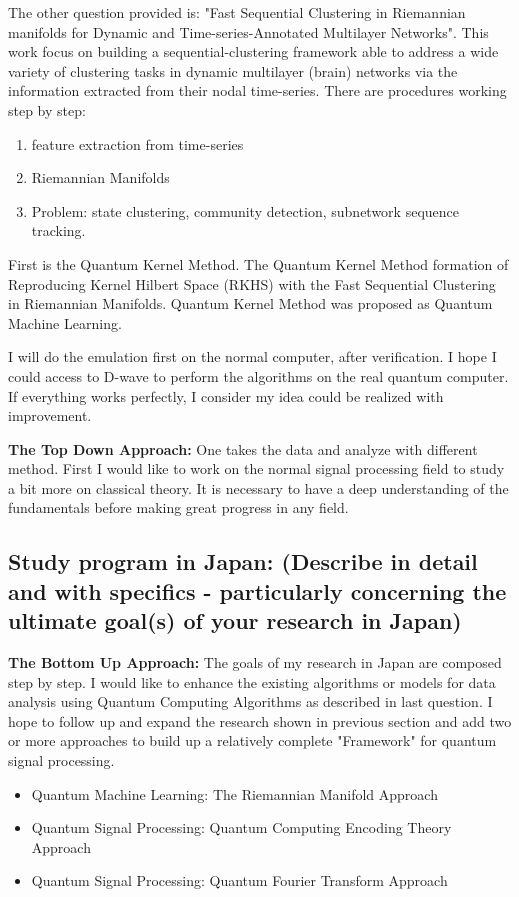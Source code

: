 \documentclass{article}
\begin{document}
The other question provided is: "Fast Sequential Clustering in Riemannian 
manifolds for Dynamic and Time-series-Annotated Multilayer Networks". This 
work focus on building a sequential-clustering framework able to address 
a wide variety of clustering tasks in dynamic multilayer (brain) networks 
via the information extracted from their nodal time-series. 
There are procedures working step by step: 
\begin{enumerate}
  \item feature extraction from time-series 
  \item Riemannian Manifolds 
  \item Problem: state clustering, community detection, 
  subnetwork sequence tracking.  
\end{enumerate}

First is the Quantum Kernel Method. 
The Quantum Kernel Method formation of 
Reproducing Kernel Hilbert Space (RKHS) with the 
Fast Sequential Clustering in Riemannian Manifolds. 
Quantum Kernel Method was proposed as Quantum Machine Learning.

I will do the emulation first on the normal computer, after verification.
I hope I could access to D-wave to perform the algorithms on the real quantum
computer.  If everything works perfectly, I consider my idea could be 
realized with improvement. 

\textbf{The Top Down Approach:}
One takes the data and analyze with 
different method. First I would like to work on the normal signal processing field 
to study a bit more on classical theory. It is necessary to have 
a deep understanding of the fundamentals before making great 
progress in any field. 

\subsection{Study program in Japan: 
(Describe in detail and with specifics - particularly 
concerning the ultimate goal(s) of your research in Japan)
}

\textbf{The Bottom Up Approach:}
The goals of my research in Japan are composed step by step. 
I would like to enhance the existing algorithms or 
models for data analysis using Quantum Computing Algorithms 
as described in last question. I hope to follow up and expand the 
research shown in previous section and add two or more approaches to build
up a relatively complete "Framework" for quantum signal processing.

\begin{itemize}
  \item Quantum Machine Learning: The Riemannian Manifold Approach
  \item Quantum Signal Processing: Quantum Computing Encoding Theory Approach
  \item Quantum Signal Processing: Quantum Fourier Transform Approach 
\end{itemize}
\end{document}
